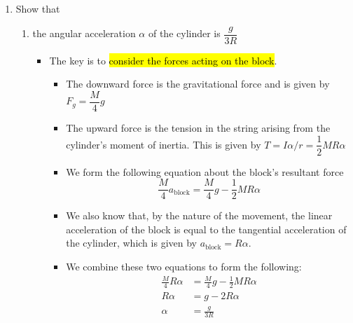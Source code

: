 \documentclass[a4paper,12pt]{article}
\begin{document}
\begin{enumerate}[label=(\alph*)]
  \item Show that
        \begin{enumerate}[label=(\roman*)]
          \item the angular acceleration $\alpha$ of the cylinder is $\dfrac{g}{3R}$
                \begin{itemize}
                  \item The key is to \hl{consider the forces acting on the block}.
                        \begin{itemize}
                          \item The downward force is the gravitational force and is given by $F_g = \dfrac{M}{4}g$
                          \item The upward force is the tension in the string arising from the cylinder's moment of inertia. This is given by $T = I\alpha/r = \dfrac{1}{2}MR\alpha$
                          \item We form the following equation about the block's resultant force
                                $$\frac{M}{4}a_\text{block} = \frac{M}{4}g - \frac{1}{2}MR\alpha$$
                          \item We also know that, by the nature of the movement, the linear acceleration of the block is equal to the tangential acceleration of the cylinder, which is given by $a_\text{block} = R\alpha$.
                          \item We combine these two equations to form the following:
                                \begin{align*}
                                  \frac{M}{4}R\alpha & = \frac{M}{4}g - \frac{1}{2}MR\alpha \\
                                  R\alpha            & = g - 2R\alpha                       \\
                                  \alpha             & = \frac{g}{3R}
                                \end{align*}


\end{itemize}
\end{itemize}
\end{enumerate}
\end{enumerate}
\end{document}
